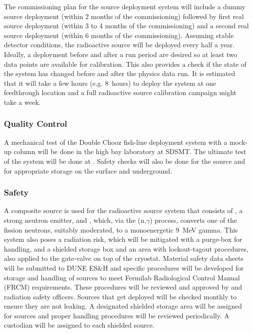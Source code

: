 The commissioning plan for the source deployment system will include a dummy source deployment (within \num{2} months of the commissioning) followed by first real source deployment (within \num{3} to \num{4} months of the commissioning) and a second real source deployment (within \num{6} months of the commissioning). Assuming stable detector conditions, the radioactive source will be deployed every half a year. Ideally, a deployment before and after a run period are desired so at least two data points are available for calibration. This also provides a check if the state of the system
has changed before and after the physics data run.
It is estimated that it will take a few hours (e.g. \num{8}~hours) to deploy the system at one feedthrough location and a full radioactive source calibration campaign might take %
a week.

\subsubsection{Quality Control}
A mechanical test of the Double Chooz fish-line deployment system with a  mock-up column will be done in the high bay laboratory at SDSMT. The ultimate test of the system will be done at . Safety checks will also be done for the source and for appropriate storage on the surface and underground. 

\subsubsection{Safety}
\label{sec:sp-calib-rsds-safety}
A composite source is used for the radioactive source system that consists  of , a strong neutron emitter, and , which, via the (n,$\gamma$) process, converts one of the  fission neutrons, suitably moderated, to a monoenergetic \SI{9}{\MeV} gamma. This system also poses a radiation risk, which will be mitigated with a purge-box for handling, and a shielded storage box and an area with lockout-tagout procedures, also applied to the gate-valve on top of the cryostat. Material safety data sheets will be submitted to DUNE ES\&H and specific procedures will be developed for storage and handling of sources to meet Fermilab Radiological Control Manual (FRCM) requirements. These procedures will be reviewed and approved by  and \fnal radiation safety officers. Sources that get deployed will be checked monthly to ensure they are not leaking. A designated shielded storage area will be assigned for sources and proper handling procedures will be reviewed periodically. A custodian will be assigned to each shielded source.